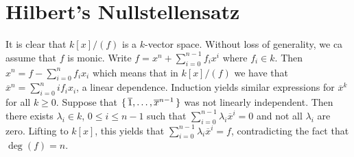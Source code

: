 \documentclass[letterpaper, 11pt, oneside]{book}
\begin{document}
\clearpage

\section{Hilbert's Nullstellensatz}

\begin{sol}\label{ex:Curves_1.37}
  It is clear that $k[x] / (f)$ is a $k$-vector space.
  Without loss of generality, we ca assume that $f$ is monic.
  Write $f = x^{n} + \sum_{i = 0}^{n - 1} f_{i}x^{i}$ where $f_{i} \in k$.
  Then $x^{n} = f - \sum_{i = 0}^{n} f_{i}x_{i}$ which means that in $k[x] / (f)$ we have that $\overline{x}^{n} = \sum_{i = 0}^{n} if_{i}x_{i}$, a linear dependence.
  Induction yields similar expressions for $\overline{x}^{k}$ for all $k \geq 0$.
  Suppose that $\set{\overline{1}, \ldots, \overline{x}^{n - 1}}$ was not linearly independent.
  Then there exists $\lambda_{i} \in k$, $0 \leq i \leq n - 1$ such that $\sum_{i = 0}^{n - 1} \lambda_{i} \overline{x}^{i} = 0$ and not all $\lambda_{i}$ are zero.
  Lifting to $k[x]$, this yields that $\sum_{i = 0}^{n - 1} \lambda_{i} \overline{x}^{i} = f$, contradicting the fact that $\deg(f) = n$.
\end{sol}


\printbibliography
\end{document}
